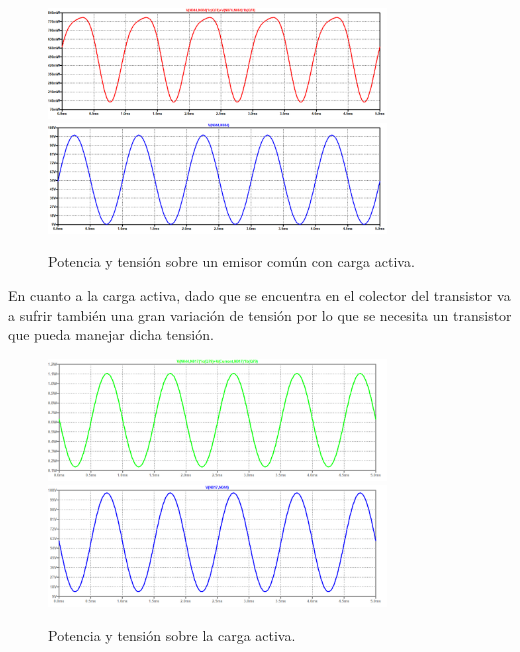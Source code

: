 \begin{figure}[H]
	\centering
	\includegraphics[width=0.8\textwidth]{ImagenesSimulaciones/PECF.png}
		\includegraphics[width=0.8\textwidth]{ImagenesSimulaciones/VECF.png}
	\caption{Potencia y tensión sobre un emisor común con carga activa.}
	\label{fig:pecf}
\end{figure}
En cuanto a la carga activa, dado que se encuentra en el colector del transistor va a  sufrir también una gran variación de tensión por lo que se necesita un transistor que pueda manejar dicha tensión.
\begin{figure}[H]
	\centering
	\includegraphics[width=0.8\textwidth]{ImagenesSimulaciones/PCSEC.png}
		\includegraphics[width=0.8\textwidth]{ImagenesSimulaciones/VCSEC.png}
	\caption{Potencia y tensión sobre la carga activa.}
	\label{fig:pcsecf}
\end{figure}


